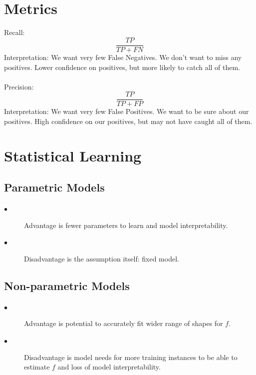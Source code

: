 \documentclass{article}
\begin{document}
\\
\\
\section{Metrics}

Recall:\[\frac{TP}{TP+FN}\]
Interpretation: We want very few False Negatives. We don't want to miss any positives. Lower confidence on positives, but more likely to catch all of them.\\
\\
Precision:\[\frac{TP}{TP+FP}\]
Interpretation: We want very few False Positives. We want to be sure about our positives. High confidence on our positives, but may not have caught all of them.


\section{Statistical Learning}

\subsection{Parametric Models}
\begin{description}

  \item[$\bullet$] Advantage is fewer parameters to learn and model interpretability.

  \item[$\bullet$] Disadvantage is the assumption itself: fixed model.

\end{description}

\subsection{Non-parametric Models}
\begin{description}

  \item[$\bullet$] Advantage is potential to accurately fit wider range of shapes for $f$.

  \item[$\bullet$] Disadvantage is model needs for more training instances to be able to estimate $f$ and loss of model interpretability.

\end{description}
\end{document}
